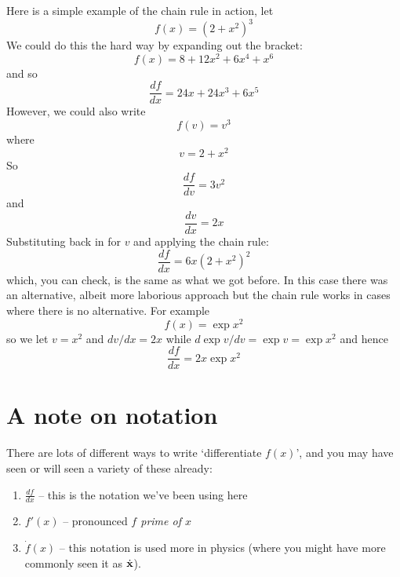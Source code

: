 \documentclass[12pt]{article}
\begin{document}
Here is a simple example of the chain rule in action, let
\begin{equation}
  f(x)=(2+x^2)^3
\end{equation}
We could do this the hard way by expanding out the bracket:
\begin{equation}
  f(x)=8+12x^2+6x^4+x^6
\end{equation}
and so
\begin{equation}
  \frac{df}{dx}=24x+24x^3+6x^5
\end{equation}
However, we could also write
\begin{equation}
  f(v)=v^3
\end{equation}
where
\begin{equation}
  v=2+x^2
\end{equation}
So
\begin{equation}
  \frac{df}{dv}=3v^2
\end{equation}
and
\begin{equation}
  \frac{dv}{dx}=2x
\end{equation}
Substituting back in for $v$ and applying the chain rule:
\begin{equation}
  \frac{df}{dx}=6x(2+x^2)^2
\end{equation}
which, you can check, is the same as what we got before. In this case
there was an alternative, albeit more laborious approach but the chain rule works in cases where there is no alternative. For example
\begin{equation}
  f(x)=\exp{x^2}
\end{equation}
so we let $v=x^2$ and $dv/dx=2x$ while $d\exp{v}/dv=\exp{v}=\exp{x^2}$ and hence
\begin{equation}
  \frac{df}{dx}=2x\exp{x^2}
\end{equation}

\section*{A note on notation}
There are lots of different ways to write `differentiate $f(x)$', and you may have seen or will seen a variety of these already:
\begin{enumerate}
    \item\label{leibniz}$\frac{df}{dx}$ -- this is the notation we've been using here
    \item\label{lagrange} $f'(x)$ -- pronounced \emph{$f$ prime of $x$}
    \item\label{newton} $\dot{f}(x)$ -- this notation is used more in physics (where you  might have more commonly seen it as $\dot{\bf{x}}$).
\end{enumerate}
\end{document}
